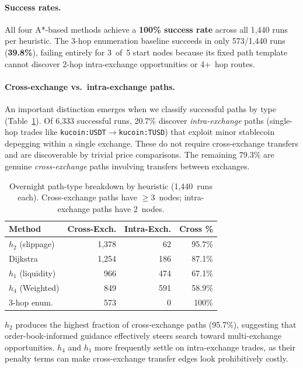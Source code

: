 \paragraph{Success rates.}
All four A*-based methods achieve a \textbf{100\% success rate} across all 1{,}440 runs per heuristic. The 3-hop enumeration baseline succeeds in only 573/1{,}440 runs (\textbf{39.8\%}), failing entirely for 3~of~5 start nodes because its fixed path template cannot discover 2-hop intra-exchange opportunities or 4+~hop routes.

\paragraph{Cross-exchange vs.\ intra-exchange paths.}
An important distinction emerges when we classify successful paths by type (Table~\ref{tab:overnight_pathtype}). Of 6{,}333 successful runs, 20.7\% discover \emph{intra-exchange} paths (single-hop trades like \texttt{kucoin:USDT}$\to$\texttt{kucoin:TUSD}) that exploit minor stablecoin depegging within a single exchange. These do not require cross-exchange transfers and are discoverable by trivial price comparisons. The remaining 79.3\% are genuine \emph{cross-exchange} paths involving transfers between exchanges.

\begin{table}[t]
\centering
\small
\caption{Overnight path-type breakdown by heuristic (1{,}440~runs each). Cross-exchange paths have $\geq$3~nodes; intra-exchange paths have 2~nodes.}
\label{tab:overnight_pathtype}
\begin{tabular}{lrrr}
\toprule
\textbf{Method} & \textbf{Cross-Exch.} & \textbf{Intra-Exch.} & \textbf{Cross \%} \\
\midrule
$h_2$ (slippage) &  1{,}378 &   62 & 95.7\% \\
Dijkstra         &  1{,}254 &  186 & 87.1\% \\
$h_1$ (liquidity)&    966 &  474 & 67.1\% \\
$h_4$ (Weighted) &    849 &  591 & 58.9\% \\
3-hop enum.      &    573 &    0 & 100\% \\
\bottomrule
\end{tabular}
\end{table}

$h_2$ produces the highest fraction of cross-exchange paths (95.7\%), suggesting that order-book-informed guidance effectively steers search toward multi-exchange opportunities. $h_4$ and $h_1$ more frequently settle on intra-exchange trades, as their penalty terms can make cross-exchange transfer edges look prohibitively costly.


